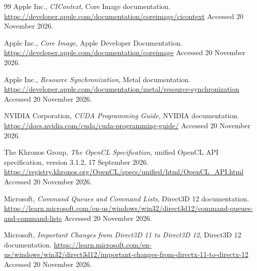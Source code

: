 \documentclass[11pt,a4paper,oneside]{article}
\begin{document}
\begin{thebibliography}{99}
Apple Inc.,
\emph{CIContext}, Core Image documentation.
\newblock \url{https://developer.apple.com/documentation/coreimage/cicontext}
\newblock Accessed 20 November 2026.

Apple Inc.,
\emph{Core Image}, Apple Developer Documentation.
\newblock \url{https://developer.apple.com/documentation/coreimage}
\newblock Accessed 20 November 2026.

Apple Inc.,
\emph{Resource Synchronization}, Metal documentation.
\newblock \url{https://developer.apple.com/documentation/metal/resource-synchronization}
\newblock Accessed 20 November 2026.

NVIDIA Corporation,
\emph{CUDA Programming Guide}, NVIDIA documentation.
\newblock \url{https://docs.nvidia.com/cuda/cuda-programming-guide/}
\newblock Accessed 20 November 2026.

The Khronos Group,
\emph{The OpenCL Specification}, unified OpenCL API specification, version 3.1.2, 17 September 2026.
\newblock \url{https://registry.khronos.org/OpenCL/specs/unified/html/OpenCL_API.html}
\newblock Accessed 20 November 2026.

Microsoft,
\emph{Command Queues and Command Lists}, Direct3D 12 documentation.
\newblock \url{https://learn.microsoft.com/en-us/windows/win32/direct3d12/command-queues-and-command-lists}
\newblock Accessed 20 November 2026.

Microsoft,
\emph{Important Changes from Direct3D 11 to Direct3D 12}, Direct3D 12 documentation.
\newblock \url{https://learn.microsoft.com/en-us/windows/win32/direct3d12/important-changes-from-directx-11-to-directx-12}
\newblock Accessed 20 November 2026.

\end{thebibliography}
\end{document}
